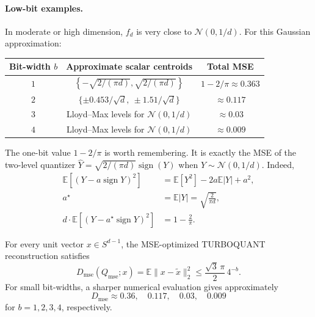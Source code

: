 \paragraph{Low-bit examples.}
In moderate or high dimension, $f_d$ is very close to $\mathcal N(0,1/d)$.
For this Gaussian approximation:
\begin{center}
\begin{tabular}{c|c|c}
Bit-width $b$ & Approximate scalar centroids & Total MSE \\
\hline
$1$ & $\left\{-\sqrt{2/(\pi d)},\sqrt{2/(\pi d)}\right\}$ & $1-2/\pi\approx 0.363$ \\
$2$ & $\{\pm 0.453/\sqrt d,\ \pm 1.51/\sqrt d\}$ & $\approx 0.117$ \\
$3$ & Lloyd--Max levels for $\mathcal N(0,1/d)$ & $\approx 0.03$ \\
$4$ & Lloyd--Max levels for $\mathcal N(0,1/d)$ & $\approx 0.009$
\end{tabular}
\end{center}
The one-bit value $1-2/\pi$ is worth remembering.
It is exactly the MSE of the two-level quantizer $\widehat Y=\sqrt{2/(\pi d)}\operatorname{sign}(Y)$ when $Y\sim\mathcal N(0,1/d)$.
Indeed,
\begin{align}
    \mathbb E[(Y-a\operatorname{sign}Y)^2]
    &=\mathbb E[Y^2]-2a\mathbb E|Y|+a^2,\\
    a^\star&=\mathbb E|Y|=\sqrt{\frac{2}{\pi d}},\\
    d\cdot \mathbb E[(Y-a^\star\operatorname{sign}Y)^2]
    &=1-\frac{2}{\pi}.
\end{align}

\begin{theorem}
\label{thm:tq-mse}
For every unit vector $x\in S^{d-1}$, the MSE-optimized TURBOQUANT reconstruction satisfies
\begin{equation}
    D_{\mathrm{mse}}(Q_{\mathrm{mse}};x)
    =\mathbb E\|x-\widetilde x\|_2^2
    \le
    \frac{\sqrt 3\,\pi}{2}\,4^{-b}.
\end{equation}
For small bit-widths, a sharper numerical evaluation gives approximately
\begin{equation}
    D_{\mathrm{mse}}\approx
    0.36,
    \quad 0.117,
    \quad 0.03,
    \quad 0.009
\end{equation}
for $b=1,2,3,4$, respectively.
\end{theorem}

